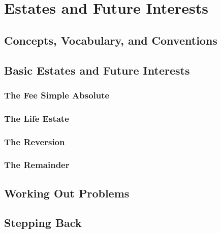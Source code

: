 \chapter{Estates and Future Interests}





\section{Concepts, Vocabulary, and Conventions}





\section{Basic Estates and Future Interests}



\subsection{The Fee Simple Absolute}




\subsection{The Life Estate}




\subsection{The Reversion}




\subsection{The Remainder}




\begin{questions}

\end{questions}

\section{Working Out Problems}




\section{Stepping Back}


